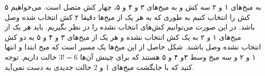 \p
به میخ‌های ۱ و ۲ سه کش و به میخ‌های ۳ و ۴ و ۵، چهار کش متصل است. می‌خواهیم ۵ کش را انتخاب کنیم به طوری که به هر یک از میخ‌ها دقیقا ۲ کش انتخاب شده وصل باشد. در این صورت می‌توانیم کش‌های انتخاب نشده را در نظر بگیریم. 
 باید هر یک از میخ‌های ۱ و ۲ به یک کش انتخاب نشده و هر یک از میخ‌های ۳ و ۴ و ۵ به دو کش انتخاب نشده وصل باشند.
شکل حاصل از این میخ‌ها یک مسیر است که میخ ابتدا و انتها ۱ و ۲ و سه میخ وسط ۳و ۴ و ۵ هستند که برای چینش آن‌ها
$3! = 6$
حالت داریم.
توجه کنید که با جایگشت میخ‌های 1 و 2 حالت جدیدی به دست نمی‌آید. 
